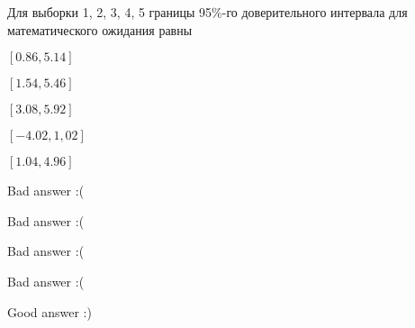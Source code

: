 
\begin{question}
Для выборки 1, 2, 3, 4, 5 границы 95\%-го доверительного интервала для
математического ожидания равны
\begin{answerlist}
  \item \([0.86, 5.14]\)
  \item \([1.54, 5.46]\)
  \item \([3.08, 5.92]\)
  \item \([-4.02, 1,02]\)
  \item \([1.04, 4.96]\)
\end{answerlist}
\end{question}

\begin{solution}
\begin{answerlist}
  \item Bad answer :(
  \item Bad answer :(
  \item Bad answer :(
  \item Bad answer :(
  \item Good answer :)
\end{answerlist}
\end{solution}


